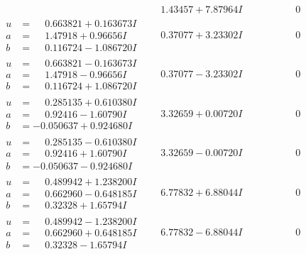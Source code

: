 \documentclass[1p]{elsarticle_modified}
\theoremstyle{definition}
\begin{document}
$$\begin{array}{c|c|c}
 & \phantom{-}1.43457 + 7.87964 I & \phantom{-0.000000 } 0 \\ \hline\begin{aligned}
u &= \phantom{-}0.663821 + 0.163673 I \\
a &= \phantom{-}1.47918 + 0.96656 I \\
b &= \phantom{-}0.116724 - 1.086720 I\end{aligned}
 & \phantom{-}0.37077 + 3.23302 I & \phantom{-0.000000 } 0 \\ \hline\begin{aligned}
u &= \phantom{-}0.663821 - 0.163673 I \\
a &= \phantom{-}1.47918 - 0.96656 I \\
b &= \phantom{-}0.116724 + 1.086720 I\end{aligned}
 & \phantom{-}0.37077 - 3.23302 I & \phantom{-0.000000 } 0 \\ \hline\begin{aligned}
u &= \phantom{-}0.285135 + 0.610380 I \\
a &= \phantom{-}0.92416 - 1.60790 I \\
b &= -0.050637 + 0.924680 I\end{aligned}
 & \phantom{-}3.32659 + 0.00720 I & \phantom{-0.000000 } 0 \\ \hline\begin{aligned}
u &= \phantom{-}0.285135 - 0.610380 I \\
a &= \phantom{-}0.92416 + 1.60790 I \\
b &= -0.050637 - 0.924680 I\end{aligned}
 & \phantom{-}3.32659 - 0.00720 I & \phantom{-0.000000 } 0 \\ \hline\begin{aligned}
u &= \phantom{-}0.489942 + 1.238200 I \\
a &= \phantom{-}0.662960 - 0.648185 I \\
b &= \phantom{-}0.32328 + 1.65794 I\end{aligned}
 & \phantom{-}6.77832 + 6.88044 I & \phantom{-0.000000 } 0 \\ \hline\begin{aligned}
u &= \phantom{-}0.489942 - 1.238200 I \\
a &= \phantom{-}0.662960 + 0.648185 I \\
b &= \phantom{-}0.32328 - 1.65794 I\end{aligned}
 & \phantom{-}6.77832 - 6.88044 I & \phantom{-0.000000 } 0 \\ \hline\begin{aligned}

\end{aligned}
\end{array}$$
\end{document}
